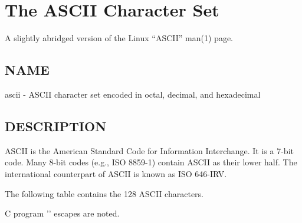 \chapter{The ASCII Character Set}
\label{chapter:ascii}

A slightly abridged version of the Linux ``ASCII'' man(1) page.

\section{NAME}

ascii - ASCII character set encoded in octal, decimal, and hexadecimal

\section{DESCRIPTION}

       ASCII is the American Standard Code for Information Interchange.  It is
       a 7-bit code.  Many 8-bit codes (e.g., ISO  8859-1)  contain  ASCII  as
       their  lower  half.  The international counterpart of ASCII is known as
       ISO 646-IRV.

       The following table contains the 128 ASCII characters.

       C program '\verb@\X@' escapes are noted.

